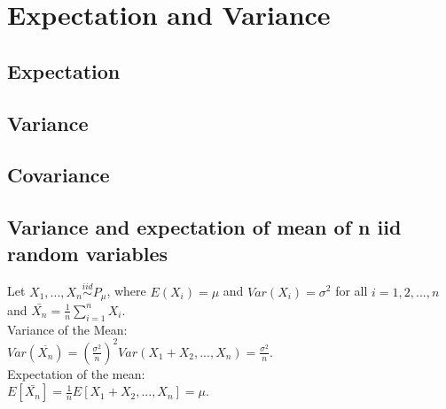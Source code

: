 \section{Expectation and Variance}
\subsection*{Expectation}
\subsection*{Variance}
\subsection*{Covariance}
\subsection*{Variance and expectation of mean of n iid random variables}
Let $X_1, ..., X_n \stackrel{iid}{\sim} P_{\mu}$, where $E(X_i)=\mu$ and $Var(X_i)=\sigma^2$ for all $i=1,2,...,n$ and $\bar{X_n}= \frac{1}{n} \sum_{i=1}^{n} X_i$.\\

Variance of the Mean:\\

$Var(\overline{X_n})=(\frac{\sigma^2}{n})^2 Var(X_1 + X_2,...,X_n) =  \frac{\sigma^2}{n}$.\\

Expectation of the mean:\\

$E[\bar{X_n}]=\frac{1}{n}E[X_1 + X_2,...,X_n] = \mu$.
